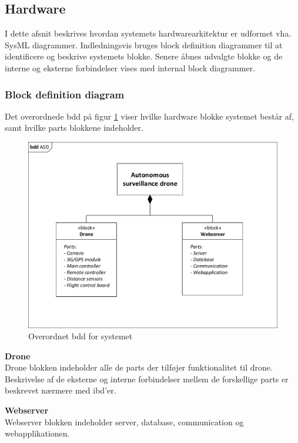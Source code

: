 \newpage

\subsection{Hardware}
I dette afsnit beskrives hvordan systemets hardwarearkitektur er udformet vha. SysML diagrammer. Indledningsvis bruges block definition diagrammer til at identificere og beskrive systemets blokke. Senere åbnes udvalgte blokke og de interne og eksterne forbindelser vises med internal block diagrammer. 


\subsubsection*{Block definition diagram}

Det overordnede bdd på figur \ref{fig:bdd_asd} viser hvilke hardware blokke systemet består af, samt hvilke parts blokkene indeholder.

\begin{figure}[H]
	\centering
	\includegraphics[width=1.0\textwidth]{Billeder/Projektbeskrivelse/bdd_overordnet.pdf}
	\caption{Overordnet bdd for systemet}
	\label{fig:bdd_asd}
\end{figure}

\textbf{Drone} \\
Drone blokken indeholder alle de parts der tilføjer funktionalitet til drone. Beskrivelse af de eksterne og interne forbindelser mellem de forskellige parts er beskrevet nærmere med ibd'er.

\textbf{Webserver} \\
Webserver blokken indeholder server, database, communication og webapplikationen.

